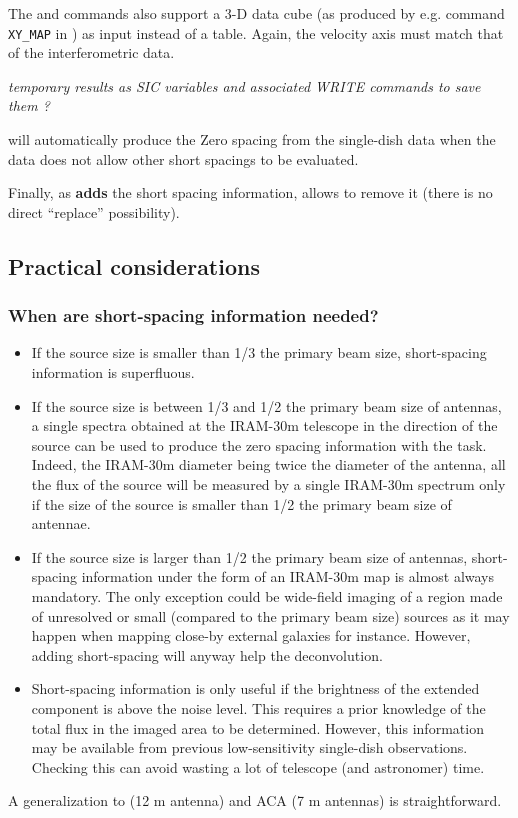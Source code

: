 The  and  commands also support
a 3-D data cube (as produced by e.g. command \texttt{XY\_MAP} in \class{})
as input instead of a \class{} table. Again, the
velocity axis must match that of the interferometric data.

\emph{\color{red} temporary results as SIC variables and associated WRITE commands
to save them ?}

 will automatically produce the Zero spacing from
the single-dish data when the data does not allow other short spacings
to be evaluated.

Finally, as  \textbf{adds} the 
short spacing information,  allows to remove
it (there is no direct ``replace'' possibility).

\subsection{Practical considerations}

\subsubsection{When are short-spacing information needed?}

\begin{itemize}
\item If the source size is smaller than 1/3 the primary beam size,
  short-spacing information is superfluous.
\item If the source size is between 1/3 and 1/2 the primary beam size of
  \NOEMA{} antennas, a single spectra obtained at the IRAM-30m telescope in
  the direction of the source can be used to produce the zero spacing
  information with the  task. Indeed, the IRAM-30m diameter
  being twice the diameter of the \NOEMA{} antenna, all the flux of the
  source will be measured by a single IRAM-30m spectrum only if the size of
  the source is smaller than 1/2 the primary beam size of \PdBI{} antennae.
\item If the source size is larger than 1/2 the primary beam size of
  \NOEMA{} antennas, short-spacing information under the form of an IRAM-30m
  map is almost always mandatory. The only exception could be wide-field
  imaging of a region made of unresolved or small (compared to the primary
  beam size) sources as it may happen when mapping close-by external
  galaxies for instance. However, adding short-spacing will anyway help the
  deconvolution. 
\item Short-spacing information is only useful if the brightness of the
  extended component is above the noise level. This requires a prior knowledge
  of the total flux in the imaged area to be determined. However, this
  information may be available from previous low-sensitivity single-dish
  observations. Checking this can avoid wasting a lot of telescope
  (and astronomer) time.
\end{itemize}
A generalization to \ALMA{} (12 m antenna) and ACA (7 m antennas)
is straightforward.


